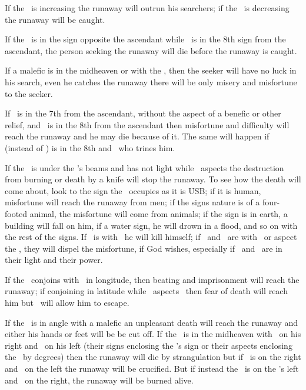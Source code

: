 If the \Moon\, is increasing the runaway will outrun his searchers; if the \Moon\, is decreasing the runaway will be caught. 

If the \Sun\, is in the sign opposite the ascendant while \Saturn\, is in the 8th sign from the ascendant, the person seeking the runaway will die before the runaway is caught. 

If a malefic is in the midheaven or with the \Sun, then the seeker will have no luck in his search, even he catches the runaway there will be only misery and misfortune to the seeker.

If \Moon\, is in the 7th from the ascendant, without the aspect of a benefic or other relief, and \Mars\, is in the 8th from the ascendant then misfortune and difficulty will reach the runaway and he may die because of it. The same will happen if \Mercury\, (instead of \Mars) is in the 8th and \Mars\, who trines him.

If the \Moon\, is under the \Sun's beams and has not light while \Mars\, aspects the destruction from burning or death by a knife will stop the runaway. To see how the death will come about, look to the sign the \Moon\, occupies as it is USB; if it is human, misfortune will reach the runaway from men; if the signs nature is of a four-footed animal, the misfortune will come from animals; if the sign is in earth, a building will fall on him, if a water sign, he will drown in a flood, and so on with the rest of the signs. If \Mercury\, is with \Saturn\, he will kill himself; if \Venus\, and \Jupiter\, are with \Mercury\, or aspect the \Moon, they will dispel the misfortune, if God wishes, especially if \Jupiter\, and \Venus\, are in their light and their power. 

If the \Moon\, conjoins with \Mars\, in longitude, then beating and imprisonment will reach the runaway; if conjoining in latitude while \Jupiter\, aspects \Mars\, 
  then fear of death will reach him but \Jupiter\, will allow him to escape.
  
If the \Moon\, is in angle with a malefic an unpleasant death will reach the runaway and either his hands or feet will be be cut off. If the \Moon\, is in the midheaven with \Mars\, on his right and \Saturn\, on his left (their signs enclosing the \Moon's sign or their aspects enclosing the \Moon\, by degrees) then the runaway will die by strangulation but if \Saturn\, is on the right and \Mars\, on the left the runaway will be crucified. But if instead the \Sun\, is on the \Moon's left and \Mars\, on the right, the runaway will be burned alive.

